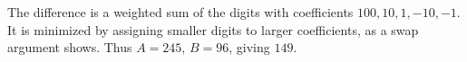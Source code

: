 The difference is a weighted sum of the digits with coefficients $100,10,1,-10,-1$. It is minimized by assigning smaller digits to larger coefficients, as a swap argument shows. Thus $A=245$, $B=96$, giving $\boxed{149}$.

